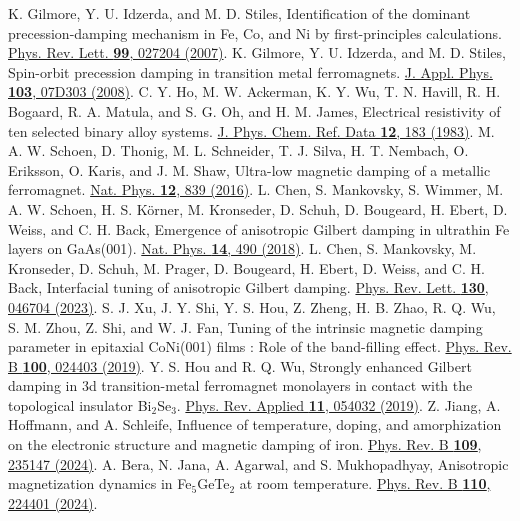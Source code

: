 \documentclass[prl,aps,twocolumn,showpacs,citeautoscript,reprint,superscriptaddress]{revtex4-1}
\newcommand{\DOI}[1]{\href{https://doi.org/#1}}
\begin{document}
\begin{thebibliography}{00}
K. Gilmore, Y. U. Idzerda, and M. D. Stiles, Identification of the dominant precession-damping mechanism in Fe, Co, and Ni by first-principles calculations. \DOI{10.1103/PhysRevLett.99.027204}{Phys. Rev. Lett. {\bf 99}, 027204 (2007)}.
K. Gilmore, Y. U. Idzerda, and M. D. Stiles, Spin-orbit precession damping in transition metal ferromagnets. \DOI{10.1063/1.2832348}{J. Appl. Phys. {\bf 103}, 07D303 (2008)}.
C. Y. Ho, M. W. Ackerman, K. Y. Wu, T. N. Havill, R. H. Bogaard, R. A. Matula, and S. G. Oh, and H. M. James, Electrical resistivity of ten selected binary alloy systems. \DOI{10.1063/1.555684}{J. Phys. Chem. Ref. Data {\bf 12}, 183 (1983)}.
M. A. W. Schoen, D. Thonig, M. L. Schneider, T. J. Silva, H. T. Nembach, O. Eriksson, O. Karis, and J. M. Shaw, Ultra-low magnetic damping of a metallic ferromagnet. \DOI{10.1038/nphys3770}{Nat. Phys. {\bf 12}, 839 (2016)}.		
L. Chen, S. Mankovsky, S. Wimmer, M.  A. W. Schoen, H. S. K{\"o}rner, M. Kronseder, D. Schuh, D. Bougeard, H. Ebert, D. Weiss, and C. H. Back, Emergence of anisotropic Gilbert damping in ultrathin Fe layers on GaAs(001). \DOI{10.1038/s41567-018-0053-8}{Nat. Phys. {\bf 14}, 490 (2018)}.
L. Chen, S. Mankovsky, M. Kronseder, D. Schuh, M. Prager, D. Bougeard, H. Ebert, D. Weiss, and C. H. Back, Interfacial tuning of anisotropic Gilbert damping. \DOI{10.1103/PhysRevLett.130.046704}{Phys. Rev. Lett. {\bf 130}, 046704 (2023)}.
S. J. Xu, J. Y. Shi, Y. S. Hou, Z. Zheng, H. B. Zhao, R. Q. Wu, S. M. Zhou, Z. Shi, and W. J. Fan, Tuning of the intrinsic magnetic damping parameter in epitaxial CoNi(001) films : Role of the band-filling effect. \DOI{10.1103/PhysRevB.100.024403}{Phys. Rev. B {\bf 100}, 024403 (2019)}.
Y. S. Hou and R. Q. Wu, Strongly enhanced Gilbert damping in 3d transition-metal ferromagnet monolayers in contact with the topological insulator Bi$_{2}$Se$_{3}$. \DOI{10.1103/PhysRevApplied.11.054032}{Phys. Rev. Applied {\bf 11}, 054032 (2019)}.
Z. Jiang, A. Hoffmann, and A. Schleife, Influence of temperature, doping, and amorphization on the electronic structure and magnetic damping of iron. \DOI{10.1103/PhysRevB.109.235147}{Phys. Rev. B {\bf 109}, 235147 (2024)}.
A. Bera, N. Jana, A. Agarwal, and S. Mukhopadhyay, Anisotropic magnetization dynamics in Fe$_5$GeTe$_2$ at room temperature. \DOI{10.1103/PhysRevB.110.224401}{Phys. Rev. B {\bf 110}, 224401 (2024)}.


\end{thebibliography}
\end{document}
